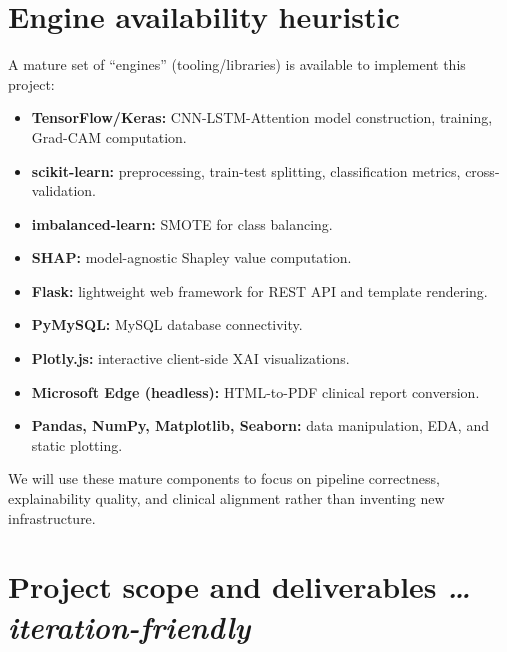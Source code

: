 \documentclass[11pt,a4paper]{article}
\newcommand{\BvrHint}[1]{%
  {\normalfont\normalsize\itshape\hfill #1}}
\begin{document}
\section{Engine availability heuristic}
A mature set of ``engines'' (tooling/libraries) is available to
implement this project:
\begin{itemize}[leftmargin=0.7cm]
    \item \textbf{TensorFlow/Keras:} CNN-LSTM-Attention model
      construction, training, Grad-CAM computation.
    \item \textbf{scikit-learn:} preprocessing, train-test splitting,
      classification metrics, cross-validation.
    \item \textbf{imbalanced-learn:} SMOTE for class balancing.
    \item \textbf{SHAP:} model-agnostic Shapley value computation.
    \item \textbf{Flask:} lightweight web framework for REST API
      and template rendering.
    \item \textbf{PyMySQL:} MySQL database connectivity.
    \item \textbf{Plotly.js:} interactive client-side XAI
      visualizations.
    \item \textbf{Microsoft Edge (headless):} HTML-to-PDF clinical
      report conversion.
    \item \textbf{Pandas, NumPy, Matplotlib, Seaborn:} data
      manipulation, EDA, and static plotting.
\end{itemize}
We will use these mature components to focus on pipeline
correctness, explainability quality, and clinical alignment rather
than inventing new infrastructure.

\section{Project scope and deliverables%
  \BvrHint{\ldots iteration-friendly}}
\end{document}
